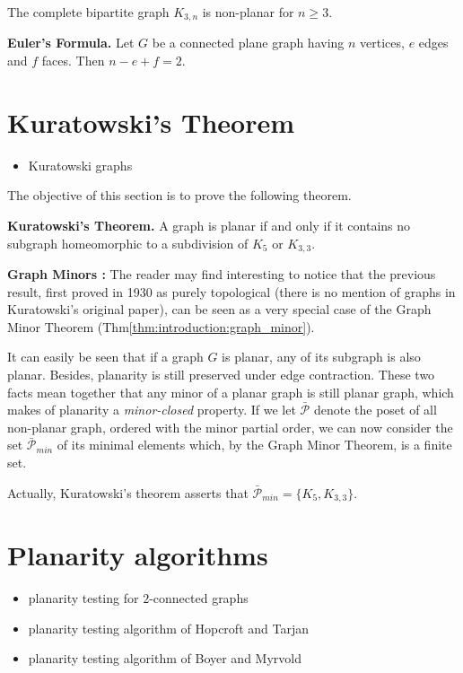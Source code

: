 \begin{theorem}
The complete bipartite graph $K_{3,n}$ is non-planar for $n \geq 3$.
\end{theorem}

\begin{theorem}
\textbf{Euler's Formula.}
Let $G$ be a connected plane graph having $n$ vertices, $e$ edges and
$f$ faces. Then $n - e + f = 2$.
\end{theorem}



\section{Kuratowski's Theorem}

\begin{itemize}
\item Kuratowski graphs
\end{itemize}

The objective of this section is to prove the following theorem.

\begin{theorem}\cite{kuratowski1930}
\label{thm:kuratowski}
{\bf Kuratowski's Theorem.}
A graph is planar if and only if it contains no subgraph homeomorphic
to a subdivision of $K_5$ or $K_{3,3}$.
\end{theorem}

{\bf Graph Minors :} The reader may find interesting to notice that the previous result, first proved in 1930 as purely topological (there is no mention of graphs in Kuratowski's original paper), can be seen as a very special case of the Graph Minor Theorem (Thm\ref{thm:introduction:graph_minor}).

It can easily be seen that if a graph $G$ is planar, any of its subgraph is also planar. Besides, planarity is still preserved under edge contraction. These two facts mean together that any minor of a planar graph is still planar graph, which makes of planarity a {\it minor-closed} property. If we let $\bar{\mathcal P}$ denote the poset of all non-planar graph, ordered with the minor partial order, we can now consider the set $\bar{\mathcal P}_{min}$ of its minimal elements which, by the Graph Minor Theorem, is a finite set.

Actually, Kuratowski's theorem asserts that $\bar{\mathcal P}_{min}=\{K_5,K_{3,3}\}$.



\section{Planarity algorithms}

\begin{itemize}
\item planarity testing for $2$-connected graphs

\item planarity testing algorithm of Hopcroft and
  Tarjan~\cite{HopcroftTarjan1974}

\item planarity testing algorithm of Boyer and
  Myrvold~\cite{BoyerMyrvold2004}
\end{itemize}
